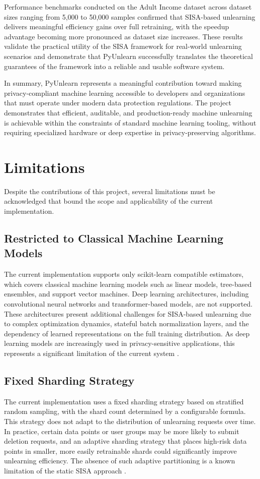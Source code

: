 Performance benchmarks conducted on the Adult Income dataset \cite{dua2019uci} across dataset sizes ranging from 5,000 to 50,000 samples confirmed that SISA-based unlearning delivers meaningful efficiency gains over full retraining, with the speedup advantage becoming more pronounced as dataset size increases. These results validate the practical utility of the SISA framework for real-world unlearning scenarios and demonstrate that PyUnlearn successfully translates the theoretical guarantees of the framework into a reliable and usable software system.

In summary, PyUnlearn represents a meaningful contribution toward making privacy-compliant machine learning accessible to developers and organizations that must operate under modern data protection regulations. The project demonstrates that efficient, auditable, and production-ready machine unlearning is achievable within the constraints of standard machine learning tooling, without requiring specialized hardware or deep expertise in privacy-preserving algorithms.

\section{Limitations}

Despite the contributions of this project, several limitations must be acknowledged that bound the scope and applicability of the current implementation.

\subsection{Restricted to Classical Machine Learning Models}
The current implementation supports only scikit-learn compatible estimators, which covers classical machine learning models such as linear models, tree-based ensembles, and support vector machines. Deep learning architectures, including convolutional neural networks and transformer-based models, are not supported. These architectures present additional challenges for SISA-based unlearning due to complex optimization dynamics, stateful batch normalization layers, and the dependency of learned representations on the full training distribution. As deep learning models are increasingly used in privacy-sensitive applications, this represents a significant limitation of the current system \cite{golatkar2020eternal}.

\subsection{Fixed Sharding Strategy}
The current implementation uses a fixed sharding strategy based on stratified random sampling, with the shard count determined by a configurable formula. This strategy does not adapt to the distribution of unlearning requests over time. In practice, certain data points or user groups may be more likely to submit deletion requests, and an adaptive sharding strategy that places high-risk data points in smaller, more easily retrainable shards could significantly improve unlearning efficiency. The absence of such adaptive partitioning is a known limitation of the static SISA approach \cite{bourtoule2021machine}.

